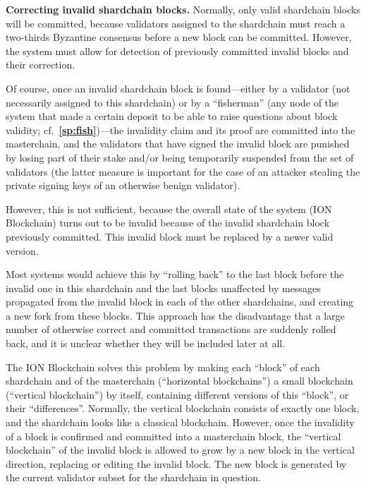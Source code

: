 \documentclass[12pt,oneside]{article}
\def\makepoint#1{\medbreak\noindent{\bf #1.\ }}
\def\nxsubpoint{\refstepcounter{subsubsection}%
  \smallbreak\makepoint{\thesubsubsection}}
\def\refpoint#1{{\rm\textbf{\ref{#1}}}}
\let\ptref=\refpoint
\def\embt(#1.){\textbf{#1.}}
\begin{document}
\nxsubpoint\label{sp:inv.sh.blk.corr} \embt(Correcting invalid
shardchain blocks.)  Normally, only valid shardchain blocks will be
committed, because validators assigned to the shardchain must reach a
two-thirds Byzantine consensus before a new block can be
committed. However, the system must allow for detection of previously
committed invalid blocks and their correction.

Of course, once an invalid shardchain block is found---either by a
validator (not necessarily assigned to this shardchain) or by a
``fisherman'' (any node of the system that made a certain deposit to
be able to raise questions about block validity;
cf.~\ptref{sp:fish})---the invalidity claim and its proof are
committed into the masterchain, and the validators that have signed
the invalid block are punished by losing part of their stake and/or
being temporarily suspended from the set of validators (the latter
measure is important for the case of an attacker stealing the private
signing keys of an otherwise benign validator).

However, this is not sufficient, because the overall state of the
system (ION Block\-chain) turns out to be invalid because of the
invalid shardchain block previously committed. This invalid block must
be replaced by a newer valid version.

Most systems would achieve this by ``rolling back'' to the last block
before the invalid one in this shardchain and the last blocks
unaffected by messages propagated from the invalid block in each of
the other shardchains, and creating a new fork from these blocks. This
approach has the disadvantage that a large number of otherwise correct
and committed transactions are suddenly rolled back, and it is unclear
whether they will be included later at all.

The ION Blockchain solves this problem by making each ``block'' of
each shardchain and of the masterchain (``horizontal blockchains'') a
small blockchain (``vertical blockchain'') by itself, containing
different versions of this ``block'', or their
``differences''. Normally, the vertical blockchain consists of exactly
one block, and the shardchain looks like a classical
blockchain. However, once the invalidity of a block is confirmed and
committed into a masterchain block, the ``vertical blockchain'' of the
invalid block is allowed to grow by a new block in the vertical
direction, replacing or editing the invalid block. The new block is
generated by the current validator subset for the shardchain in
question.
\end{document}
